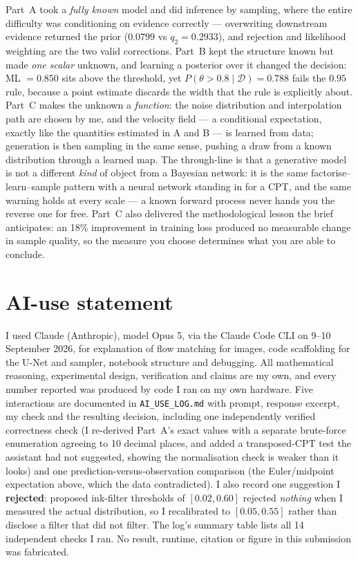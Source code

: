 \documentclass[10pt,a4paper]{article}
\newcommand{\D}{\mathcal{D}}
\begin{document}
Part~A took a \emph{fully known} model and did inference by sampling, where the entire difficulty was
conditioning on evidence correctly --- overwriting downstream evidence returned the prior ($0.0799$ vs
$q_2=0.2933$), and rejection and likelihood weighting are the two valid corrections. Part~B kept the
structure known but made \emph{one scalar} unknown, and learning a posterior over it changed the
decision: ML $=0.850$ sits above the threshold, yet $P(\theta>0.8\mid\D)=0.788$ fails the $0.95$ rule,
because a point estimate discards the width that the rule is explicitly about. Part~C makes the unknown
a \emph{function}: the noise distribution and interpolation path are chosen by me, and the velocity
field --- a conditional expectation, exactly like the quantities estimated in A and B --- is learned from
data; generation is then sampling in the same sense, pushing a draw from a known distribution through a
learned map. The through-line is that a generative model is not a different \emph{kind} of object from a
Bayesian network: it is the same factorise--learn--sample pattern with a neural network standing in for
a CPT, and the same warning holds at every scale --- a known forward process never hands you the reverse
one for free. Part~C also delivered the methodological lesson the brief anticipates: an 18\% improvement
in training loss produced no measurable change in sample quality, so the measure you choose determines
what you are able to conclude.

\section*{AI-use statement}

I used Claude (Anthropic), model Opus 5, via the Claude Code CLI on 9--10 September 2026, for
explanation of flow matching for images, code scaffolding for the U-Net and sampler, notebook structure
and debugging. All mathematical reasoning, experimental design, verification and claims are my own, and
every number reported was produced by code I ran on my own hardware. Five interactions are documented
in \texttt{AI\_USE\_LOG.md} with prompt, response excerpt, my check and the resulting decision,
including one independently verified correctness check (I re-derived Part~A's exact values with a
separate brute-force enumeration agreeing to 10 decimal places, and added a transposed-CPT test the
assistant had not suggested, showing the normalisation check is weaker than it looks) and one
prediction-versus-observation comparison (the Euler/midpoint expectation above, which the data
contradicted). I also record one suggestion I \textbf{rejected}: proposed ink-filter thresholds of
$[0.02,0.60]$ rejected \emph{nothing} when I measured the actual distribution, so I recalibrated to
$[0.05,0.55]$ rather than disclose a filter that did not filter. The log's summary table lists all 14
independent checks I ran. No result, runtime, citation or figure in this submission was fabricated.
\end{document}
